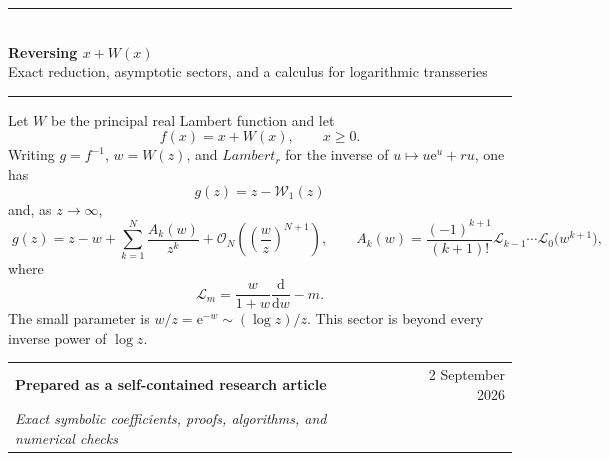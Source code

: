 \documentclass[11pt]{article}
\theoremstyle{clean}
\newcommand{\rLambert}{\mathcal W}
\newcommand{\e}{\mathrm e}
\newcommand{\bigO}{\mathcal O}
\begin{document}
\hypersetup{pageanchor=false}

\begin{titlepage}
\thispagestyle{empty}
\vspace*{1.0in}

{\color{accent}\rule{\textwidth}{1.1pt}}\\[1.2em]
{\Huge\bfseries\color{ink}
Reversing \(x+W(x)\)}\\[0.65em]
{\fontsize{17}{21}\selectfont\color{accent}
Exact reduction, asymptotic sectors, and a calculus for logarithmic transseries}\\[1.2em]
{\color{accent}\rule{\textwidth}{1.1pt}}

\vspace{1.2in}

\begin{mainbox}
Let \(W\) be the principal real Lambert function and let
\[
  f(x)=x+W(x),\qquad x\ge 0.
\]
Writing \(g=f^{-1}\), \(w=W(z)\), and
\(
Lambert_r\) for the inverse of \(u\mapsto u\e^u+ru\), one has
\[
  \boxed{\;g(z)=z-\rLambert_1(z)\;}
\]
and, as \(z\to\infty\),
\[
  \boxed{\;
  g(z)=z-w+\sum_{k=1}^{N}\frac{A_k(w)}{z^k}
       +\bigO_N\!\left(\left(\frac{w}{z}\right)^{N+1}\right),
  \qquad
  A_k(w)=\frac{(-1)^{k+1}}{(k+1)!}
  \mathcal L_{k-1}\cdots\mathcal L_0\bigl(w^{k+1}\bigr),
  \;}
\]
where
\[
  \mathcal L_m=\frac{w}{1+w}\frac{\mathrm d}{\mathrm dw}-m.
\]
The small parameter is \(w/z=\e^{-w}\sim (\log z)/z\).  This sector is
beyond every inverse power of \(\log z\).
\end{mainbox}

\vfill
\begin{tabularx}{\textwidth}{@{}Xr@{}}
\textbf{Prepared as a self-contained research article} & 2 September 2026\\
\textit{Exact symbolic coefficients, proofs, algorithms, and numerical checks} &
\end{tabularx}
\end{titlepage}
\hypersetup{pageanchor=true}
\end{document}
